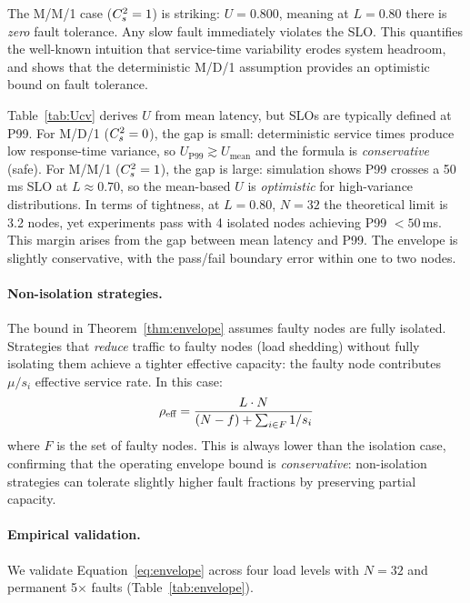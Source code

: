 The M/M/1 case ($C_s^2 = 1$) is striking: $U = 0.800$, meaning at
$L = 0.80$ there is \emph{zero} fault tolerance. Any slow fault
immediately violates the SLO. This quantifies the well-known
intuition that service-time variability erodes system headroom, and
shows that the deterministic M/D/1 assumption provides an optimistic
bound on fault tolerance.

\begin{remark}
\label{rem:mean-p99}
\label{rem:tight}
Table~\ref{tab:Ucv} derives $U$ from mean latency, but SLOs are
typically defined at P99.
For M/D/1 ($C_s^2 = 0$), the gap is small: deterministic service
times produce low response-time variance, so
$U_{\text{P99}} \gtrsim U_{\text{mean}}$ and the formula is
\emph{conservative} (safe).
For M/M/1 ($C_s^2 = 1$), the gap is large: simulation shows P99
crosses a 50\,ms SLO at $L \approx 0.70$, so the mean-based $U$ is
\emph{optimistic} for high-variance distributions.
In terms of tightness, at $L = 0.80$, $N = 32$ the theoretical limit
is 3.2 nodes, yet experiments pass with 4 isolated nodes achieving
P99 $< 50$\,ms. This margin arises from the gap between mean latency
and P99. The envelope is slightly conservative, with the pass/fail
boundary error within one to two nodes.
\end{remark}

\paragraph{Non-isolation strategies.}
The bound in Theorem~\ref{thm:envelope} assumes faulty nodes are fully
isolated. Strategies that \emph{reduce} traffic to faulty nodes (load
shedding) without fully isolating them achieve a tighter effective
capacity: the faulty node contributes $\mu/s_i$ effective service rate.
In this case:
\begin{equation}
  \rho_{\text{eff}} = \frac{L \cdot N}{(N-f) + \sum_{i \in F} 1/s_i}
\end{equation}
where $F$ is the set of faulty nodes. This is always lower than the
isolation case, confirming that the operating envelope bound is
\emph{conservative}: non-isolation strategies can tolerate slightly
higher fault fractions by preserving partial capacity.

\paragraph{Empirical validation.}
We validate Equation~\ref{eq:envelope} across four load levels with
$N = 32$ and permanent 5$\times$ faults (Table~\ref{tab:envelope}).


